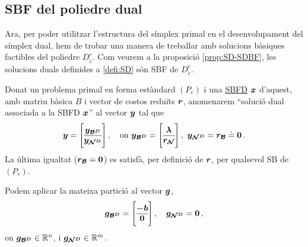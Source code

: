 \subsection{SBF del poliedre dual}
Ara, per poder utilitzar l'estructura del símplex primal en el desenvolupament
del símplex dual, hem de trobar una manera de treballar amb solucions bàsiques
factibles del poliedre $D^e_{\tilde{e}}$. Com veurem a la proposició
\ref{prop:SD-SDBF}, les solucions duals definides a \ref{defi:SD} són SBF de
$D^e_{\tilde{e}}$. 

\begin{defi}\label{defi:SD}
	Donat un problema primal en forma estàndard $(P_e)$ i una
	\hyperref[defi:SBFD]{SBFD} $\boldsymbol{x}$ d'aquest, amb matriu bàsica $B$ i 
	vector de
	costos reduïts $\boldsymbol{r}$, anomenarem ``solució dual associada a la SBFD
	$\boldsymbol{x}$'' al vector $\boldsymbol{y}$ tal que
	\[
	\vb{y} = 
	\left[\begin{array}{@{}c@{}}
	\vb{y_{\B^D}}\\
	\hline
	\vb{y_{\N^D}}
	\end{array}\right],\quad\text{on }
	\vb{y_{\B^D}}=
	\left[\begin{array}{@{}c@{}}
	\vb{\lambda}\\
	\hline
	\vb{r_\N}
	\end{array}\right],\ 
	\vb{y_{\N^D}} = \vb{r_\B} \doteq \vb{0}\,.	
	\]
	La última igualtat ($\boldsymbol{r_{\mathcal{B}}}=\boldsymbol{0}$) es satisfà, per definició de 
	$\boldsymbol{r}$,
	per qualsevol SB de $(P_e)$.
\end{defi}


Podem aplicar la mateixa partició al vector $\boldsymbol{g}$,
\[
\vb{g_{\B^D}} = 
\left[\begin{array}{@{}c@{}}
\vb{-b}\\
\hline
\vb{0}\\
\end{array}\right], \quad
%
\vb{g_{\N^D}} = \vb{0}\,,
\]
on $\boldsymbol{g_{\mathcal{B}^D}}\in \mathbb{R}^{n}$, i $\boldsymbol{g_{\mathcal{N}^D}}\in \mathbb{R}^m$.


